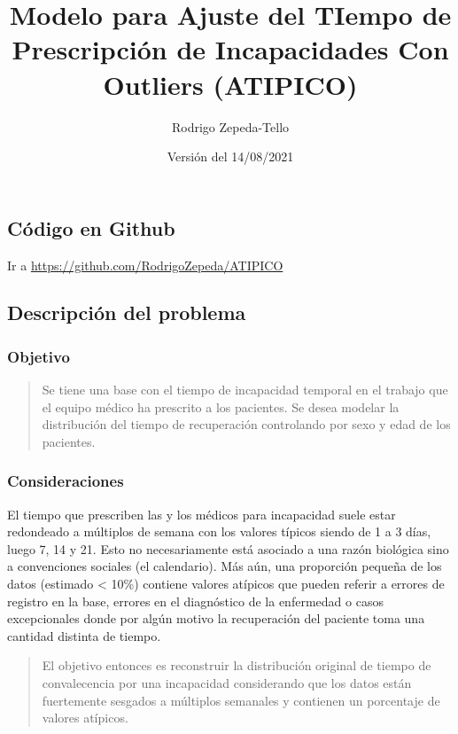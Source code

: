 \documentclass[
]{article}
\title{Modelo para \textbf{A}juste del \textbf{TI}empo de
\textbf{P}rescripción de \textbf{I}ncapacidades \textbf{C}on
\textbf{O}utliers (\textbf{ATIPICO})}
\author{Rodrigo Zepeda-Tello}
\date{Versión del 14/08/2021}
\begin{document}
\maketitle

\hypertarget{cuxf3digo-en-github}{%
\subsection{Código en Github}\label{cuxf3digo-en-github}}

Ir a \url{https://github.com/RodrigoZepeda/ATIPICO}

\hypertarget{descripciuxf3n-del-problema}{%
\subsection{Descripción del
problema}\label{descripciuxf3n-del-problema}}

\hypertarget{objetivo}{%
\subsubsection{Objetivo}\label{objetivo}}

\begin{quote}
Se tiene una base con el tiempo de incapacidad temporal en el trabajo
que el equipo médico ha prescrito a los pacientes. Se desea modelar la
distribución del tiempo de recuperación controlando por sexo y edad de
los pacientes.
\end{quote}

\hypertarget{consideraciones}{%
\subsubsection{Consideraciones}\label{consideraciones}}

El tiempo que prescriben las y los médicos para incapacidad suele estar
redondeado a múltiplos de semana con los valores típicos siendo de 1 a 3
días, luego 7, 14 y 21. Esto no necesariamente está asociado a una razón
biológica sino a convenciones sociales (el calendario). Más aún, una
proporción pequeña de los datos (estimado \textless{} 10\%) contiene
valores atípicos que pueden referir a errores de registro en la base,
errores en el diagnóstico de la enfermedad o casos excepcionales donde
por algún motivo la recuperación del paciente toma una cantidad distinta
de tiempo.

\begin{quote}
El objetivo entonces es reconstruir la distribución original de tiempo
de convalecencia por una incapacidad considerando que los datos están
fuertemente sesgados a múltiplos semanales y contienen un porcentaje de
valores atípicos.
\end{quote}
\end{document}

